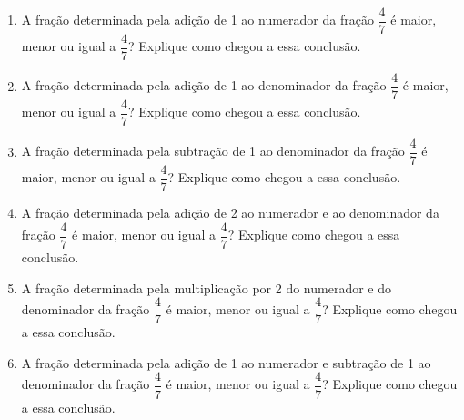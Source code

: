 \documentclass[10 pt,usenames,dvipsnames, oneside]{article}
\begin{document}
\begin{enumerate} %
\item     A fração determinada pela adição de 1 ao numerador da fração     $\dfrac{4}{7}$ é maior, menor ou igual a     $\dfrac{4}{7}$? Explique como chegou a essa conclusão.
\item     A fração determinada pela adição de 1 ao denominador da fração     $\dfrac{4}{7}$ é maior, menor ou igual a     $\dfrac{4}{7}$? Explique como chegou a essa conclusão.
\item     A fração determinada pela subtração de 1 ao denominador da fração     $\dfrac{4}{7}$ é maior, menor ou igual a     $\dfrac{4}{7}$? Explique como chegou a essa conclusão.
\item     A fração determinada pela adição de 2 ao numerador e ao denominador da fração     $\dfrac{4}{7}$ é maior, menor ou igual a     $\dfrac{4}{7}$? Explique como chegou a essa conclusão.
\item     A fração determinada pela multiplicação por 2 do numerador e do denominador da fração     $\dfrac{4}{7}$ é maior, menor ou igual a     $\dfrac{4}{7}$? Explique como chegou a essa conclusão.
\item     A fração determinada pela adição de 1 ao numerador e subtração de 1 ao denominador da fração     $\dfrac{4}{7}$ é maior, menor ou igual a     $\dfrac{4}{7}$? Explique como chegou a essa conclusão.
\end{enumerate} %
\end{document}
